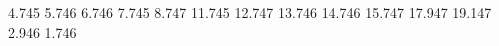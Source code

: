 %
%
%
%

\usetikzlibrary{calc}

\newlength{\pitch}
\setlength{\pitch}{0.42cm}
\expandafter\def\csname col-a\endcsname{4.745}
\expandafter\def\csname col-b\endcsname{5.746}
\expandafter\def\csname col-c\endcsname{6.746}
\expandafter\def\csname col-d\endcsname{7.745}
\expandafter\def\csname col-e\endcsname{8.747}
\expandafter\def\csname col-f\endcsname{11.745}
\expandafter\def\csname col-g\endcsname{12.747}
\expandafter\def\csname col-h\endcsname{13.746}
\expandafter\def\csname col-i\endcsname{14.746}
\expandafter\def\csname col-j\endcsname{15.747}
\expandafter\def\csname col-tp\endcsname{17.947}
\expandafter\def\csname col-tm\endcsname{19.147}
\expandafter\def\csname col-bm\endcsname{2.946}
\expandafter\def\csname col-bp\endcsname{1.746}

\newcommand{\hole}[2]{({1.356+(#1)},{\csname col-#2\endcsname})}
\newcommand{\col}[1]{\csname col-#1\endcsname}
\newcommand{\rowx}[1]{{1.356+(#1)}}

